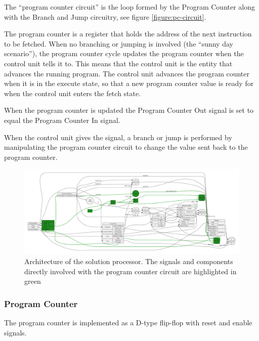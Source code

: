 The ``program counter circuit'' is the loop formed by the Program Counter along with the Branch and Jump circuitry, see figure \vref{figure:pc-circuit}.

The program counter is a register that holds the address of the next instruction to be fetched.
When no branching or jumping is involved (the ``sunny day scenario''), the program counter cycle updates the program counter when the control unit tells it to.
This means that the control unit is the entity that advances the running program.
The control unit advances the program counter when it is in the execute state, so that a new program counter value is ready for when the control unit enters the fetch state.

When the program counter is updated the Program Counter Out signal is set to equal the Program Counter In signal.

When the control unit gives the signal, a branch or jump is performed by manipulating the program counter circuit to change the value sent back to the program counter.

\begin{figure}[h!]
	\begin{center}
		\includegraphics[keepaspectratio, height=\textheight, width=\textwidth]{graphics/cpu-architecture/cpu-arc-pc-circuit.pdf}
		\caption{Architecture of the solution processor. The signals and components directly involved with the program counter circuit are highlighted in green}
		\label{figure:pc-circuit}
	\end{center}
\end{figure}


\subsubsection{Program Counter}

The program counter is implemented as a D-type flip-flop with reset and enable signals.


